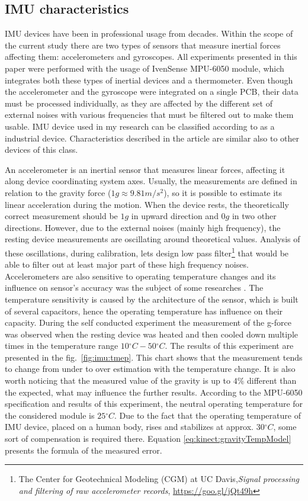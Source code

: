 \documentclass[sensors,article,submit,moreauthors,pdftex,10pt,a4paper]{mdpi}
\newcommand{\degree}{\ensuremath{{}^{\circ}}\xspace}
\begin{document}
\subsection{IMU characteristics}
IMU devices have been in professional usage from decades. Within the scope of the current study there are two types of sensors that measure inertial forces affecting them: accelerometers and gyroscopes. All experiments presented in this paper were performed with the usage of IvenSense MPU-6050 module, which integrates both these types of inertial devices and a thermometer. Even though the accelerometer and the gyroscope were integrated on a single PCB, their data must be processed individually, as they are affected by the different set of external noises with various frequencies that must be filtered out to make them usable. IMU device used in my research can be classified according to \cite{Alexiev2013} as a industrial device. Characteristics described in the article are similar also to other devices of this class.
	
An accelerometer is an inertial sensor that measures linear forces, affecting it along device coordinating system axes. Usually, the measurements are defined in relation to the gravity force ($1g \approx 9.81  m/{s^2}$), so it is possible to estimate its linear acceleration during the motion. When the device rests, the theoretically correct measurement should be $1g$ in upward direction and $0g$ in two other directions. However, due to the external noises (mainly high frequency), the resting device measurements are oscillating around theoretical values. Analysis of these oscillations, during calibration, lets design low pass filter\footnote{The Center for Geotechnical Modeling (CGM) at UC Davis,\textit{Signal processing and filtering of raw accelerometer records}, \url{https://goo.gl/jQt49h}}\cite{Wang2011} that would be able to filter out at least major part of these high frequency noises. Accelerometers are also sensitive to operating temperature changes and its influence on sensor’s accuracy was the subject of some researches \cite{Schneider2006, Grigorie1996}. The temperature sensitivity is caused by the architecture of the sensor, which is built of several capacitors, hence the operating temperature has influence on their capacity. During the self conducted experiment the measurement of the g-force was observed when the resting device was heated and then cooled down multiple times in the temperature range $10\degree C - 50\degree C$. The results of this experiment are presented in the fig.~\ref{fig:imu:tmep}. This chart shows that the measurement tends to change from under to over estimation with the temperature change. It is also worth noticing that the measured value of the gravity is up to $4\%$ different than the expected, what may influence the further results. According to the MPU-6050 specification and results of this experiment, the neutral operating temperature for the considered module is $25\degree C$. Due to the fact that the operating temperature of IMU device, placed on a human body, rises and stabilizes at approx. $30 \degree C$, some sort of compensation is required there. Equation \ref{eq:kinect:gravityTempModel} presents the formula of the measured error.
	
\end{document}

